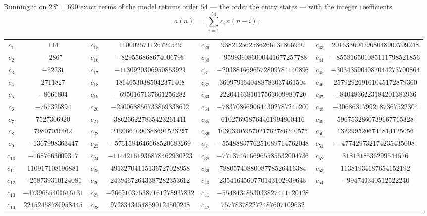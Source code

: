 \documentclass[11pt,a4paper]{article}
\theoremstyle{plain}
\theoremstyle{definition}
\begin{document}
Running it on $2S'=690$ exact terms of the model returns order $54$ --- the order the
entry states --- with the integer coefficients
\[
a(n)\;=\;\sum_{i=1}^{54}c_i\,a(n-i),
\]
\begin{center}\small
\begin{tabular}{cccccccc}
$c_{1}$ & $114$ & $c_{15}$ & $110002571126724549$ & $c_{29}$ & $938212562586266131806940$ & $c_{43}$ & $2016336047968048902709248$ \\
$c_{2}$ & $-2867$ & $c_{16}$ & $-829556868674006798$ & $c_{30}$ & $-959939086000441677257788$ & $c_{44}$ & $-855816501085111798521856$ \\
$c_{3}$ & $-52231$ & $c_{17}$ & $-1130920306950853929$ & $c_{31}$ & $-2038816696572809784140896$ & $c_{45}$ & $-303435904087044273700864$ \\
$c_{4}$ & $2711827$ & $c_{18}$ & $18146530385042371408$ & $c_{32}$ & $3609791640488783037461504$ & $c_{46}$ & $257929269161045172879360$ \\
$c_{5}$ & $-8661804$ & $c_{19}$ & $-6950167137661256282$ & $c_{33}$ & $2220416381017563009980720$ & $c_{47}$ & $-8404836223184201383936$ \\
$c_{6}$ & $-757325894$ & $c_{20}$ & $-250068856733869338602$ & $c_{34}$ & $-7837086690644302787241200$ & $c_{48}$ & $-30686317992187367522304$ \\
$c_{7}$ & $7527306920$ & $c_{21}$ & $386266227835423261411$ & $c_{35}$ & $610276958764461994800416$ & $c_{49}$ & $5967532860739167715328$ \\
$c_{8}$ & $79807056462$ & $c_{22}$ & $2190664090388691523297$ & $c_{36}$ & $10303905957021762786240576$ & $c_{50}$ & $1322995206744814125056$ \\
$c_{9}$ & $-1367998363447$ & $c_{23}$ & $-5761584646668520683269$ & $c_{37}$ & $-5548883776251089714762048$ & $c_{51}$ & $-477429732174235435008$ \\
$c_{10}$ & $-1687663009317$ & $c_{24}$ & $-11442161936878462930223$ & $c_{38}$ & $-7713746166965585532004736$ & $c_{52}$ & $3181318536299544576$ \\
$c_{11}$ & $110917108096881$ & $c_{25}$ & $49132704115136727028958$ & $c_{39}$ & $7880574088008778526416384$ & $c_{53}$ & $11381934187654152192$ \\
$c_{12}$ & $-258739310124081$ & $c_{26}$ & $24394672643387282353612$ & $c_{40}$ & $2354164560770143102939648$ & $c_{54}$ & $-994740340512522240$ \\
$c_{13}$ & $-4739655400616131$ & $c_{27}$ & $-266910375387161278937832$ & $c_{41}$ & $-5548434853033827411120128$ &  &  \\
$c_{14}$ & $22152458780958445$ & $c_{28}$ & $97283434548590124500248$ & $c_{42}$ & $757783782272487607109632$ &  &  \\
\end{tabular}
\end{center}
\end{document}

